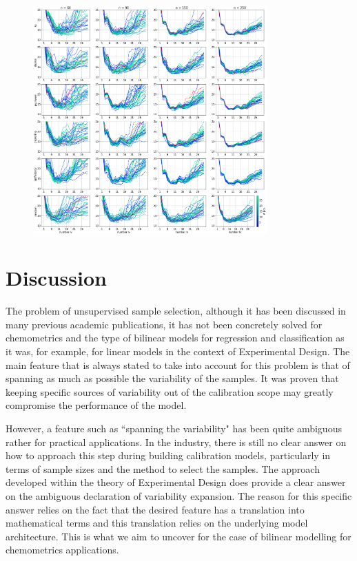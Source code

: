 \documentclass{article}
\begin{document}
\begin{figure}[b]
\includegraphics[width=0.8\textwidth]{manuscript/figures/d02_manure_model_performance.png}
\centering
\caption{}
\label{fig_d02_manure_model_performance}
\end{figure}


\section*{Discussion}\label{discussion}

The problem of unsupervised sample selection, although it has been discussed in many previous academic publications, it has not been concretely solved for chemometrics and the type of bilinear models for regression and classification as it was, for example, for linear models in the context of Experimental Design. The main feature that is always stated to take into account for this problem is that of spanning as much as possible the variability of the samples. It was proven that keeping specific sources of variability out of the calibration scope may greatly compromise the performance of the model. 

However, a feature such as ``spanning the variability" has been quite ambiguous rather for practical applications. In the industry, there is still no clear answer on how to approach this step during building calibration models, particularly in terms of sample sizes and the method to select the samples. The approach developed within the theory of Experimental Design does provide a clear answer on the ambiguous declaration of variability expansion. The reason for this specific answer relies on the fact that the desired feature has a translation into mathematical terms and this translation relies on the underlying model architecture. This is what we aim to uncover for the case of bilinear modelling for chemometrics applications. 
\end{document}
